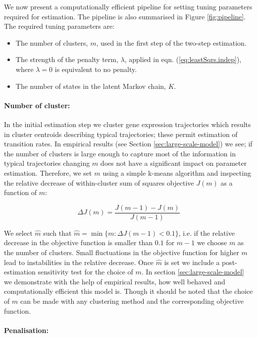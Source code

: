 We now present a computationally efficient pipeline for setting tuning parameters required for estimation. The pipeline is also summarised in Figure \ref{fig:pipeline}. The required tuning parameters are:

\begin{itemize}
\item The number of clusters, $m$, used in the first step of the two-step estimation.
\item The strength of the penalty term, $\lambda$, applied in eqn. (\ref{eq:leastSqrs.indep}), where $\lambda=0$ is equivalent to no penalty.
\item The number of states in the latent Markov chain, $K$.
\end{itemize}

\paragraph{Number of cluster:}
\label{sec:number-cluster}

In the initial estimation step we cluster gene expression trajectories which results in cluster centroids describing typical trajectories; these permit estimation of transition rates. In empirical results (see Section \ref{sec:large-scale-model}) we see; if the number of clusters is large enough to capture most of the information in typical trajectories changing $m$ does not have a significant impact on parameter estimation. Therefore, we set $m$ using a simple k-means algorithm and inspecting the relative decrease of within-cluster sum of squares objective $J(m)$ as a function of $m$:

\[
\Delta J(m) = \frac{J(m-1) - J(m)}{J(m - 1)}
\]

We select $\hat{m}$  such that $\hat{m} = \min \lbrace m : \Delta J(m-1) < 0.1 \rbrace$, i.e. if the relative decrease in the objective function is smaller than $0.1$ for $m-1$ we choose $m$ as the number of clusters. Small fluctuations in the objective function for higher $m$ lead to instabilities in the relative decrease. Once $\hat{m}$ is set we include a post-estimation sensitivity test for the choice of $m$. In section \ref{sec:large-scale-model} we demonstrate with the help of empirical results, how well behaved and computationally efficient this model is. Though it should be noted that the choice of $m$ can be made with any clustering method and the corresponding objective function.

\paragraph{Penalisation:}
\label{sec:penalization}


